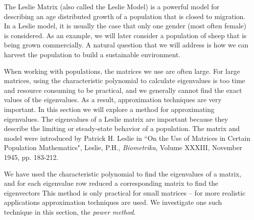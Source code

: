  \label{chap:approx_eigenvalues}

\vspace*{-17 pt}

\vspace*{13 pt}

\label{sec:appl_leslie_mtx}

The Leslie Matrix (also called the Leslie Model) is a powerful model for describing an age distributed growth of a population that is closed to migration. In a Leslie model, it is usually the case that only one gender (most often female) is considered. As an example, we will later consider a population of sheep that is being grown commercially. A natural question that we will address is how we can harvest the population to build a sustainable environment.

When working with populations, the matrices we use are often large. For large matrices, using the characteristic polynomial to calculate eigenvalues is too time and resource consuming to be practical, and we generally cannot find the exact values of the eigenvalues. As a result, approximation techniques are very important. In this section we will explore a method for approximating eigenvalues. The eigenvalues of a Leslie matrix are important because they describe the limiting or steady-state behavior of a population. The matrix and model were introduced by Patrick H. Leslie in ``On the Use of Matrices in Certain Population Mathematics", Leslie, P.H., \emph{Biometrika}, Volume XXXIII, November 1945, pp. 183-212.


\label{sec:app_eigen_intro}

We have used the characteristic polynomial to find the eigenvalues of a matrix, and for each eigenvalue row reduced a corresponding matrix to find the eigenvectors This method is only practical for small matrices -- for more realistic applications approximation techniques are used. We investigate one such technique in this section, the \emph{power method}. 


